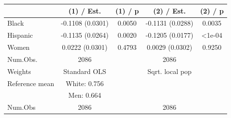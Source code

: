 
\begin{tabular}[t]{lcccc}
\toprule
  & (1) / Est. & (1) / p & (2) / Est. & (2) / p\\
\midrule
Black & -0.1108 
(0.0301) & 0.0050 & -0.1131 
(0.0288) & 0.0035\\
Hispanic & -0.1135 
(0.0264) & 0.0020 & -0.1205 
(0.0177) & <1e-04\\
Women & 0.0222 
(0.0301) & 0.4793 & 0.0029 
(0.0302) & 0.9250\\
\midrule
Num.Obs. & 2086 &  & 2086 & \\
Weights & Standard OLS &  & Sqrt. local pop & \\
Reference mean & White: 0.756 &  &  & \\
 & Men: 0.664 &  &  & \\
Num.Obs & 2086 &  & 2086 & \\
\bottomrule
\end{tabular}
